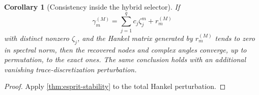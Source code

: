 \documentclass[11pt]{article}
\newtheorem{corollary}[theorem]{Corollary}
\numberwithin{equation}{section}
\begin{document}
\begin{corollary}[Consistency inside the hybrid selector]\label{cor:esprit-hybrid}
If
\begin{equation}\label{eq:esprit-hybrid-pert}
 \gamma_m^{(M)}=\sum_{j=1}^qc_j\zeta_j^m+r_m^{(M)}
\end{equation}
with distinct nonzero $\zeta_j$, and the Hankel matrix generated by $r_m^{(M)}$ tends to zero in spectral norm, then the recovered nodes and complex angles converge, up to permutation, to the exact ones.  The same conclusion holds with an additional vanishing trace-discretization perturbation.
\end{corollary}
\begin{proof}
Apply \cref{thm:esprit-stability} to the total Hankel perturbation.
\end{proof}
\end{document}
